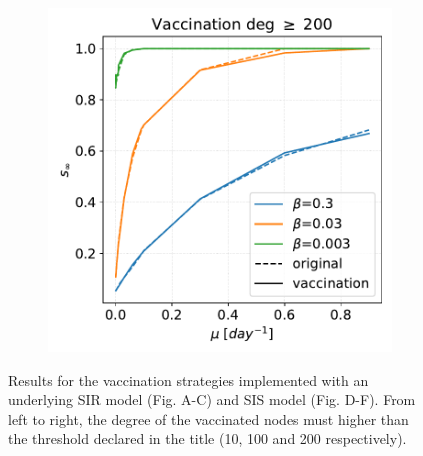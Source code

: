 \documentclass[a4paper,11pt, twocolumn]{article}
\begin{document}
\begin{figure}[t!]
\begin{subfigure}[t]{0.32\textwidth}
\caption{}
\end{subfigure}
\begin{subfigure}[t]{0.32\textwidth}
 \centering
\includegraphics[scale=0.30]{./Figure/SIS/vax_deg_200.pdf}
\caption{}
\end{subfigure}
\caption{Results for the vaccination strategies implemented with an underlying SIR model (Fig. A-C) and SIS model (Fig. D-F). From left to right, the degree of the vaccinated nodes must higher than the threshold declared in the title (10, 100 and 200 respectively).}
\label{static_sims}
\end{figure}
\end{document}
